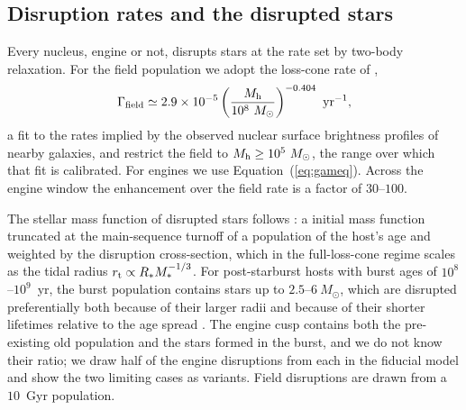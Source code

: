 \documentclass[twocolumn,pdftex]{aastex701}
\newcommand{\msun}{M_{\odot}\xspace}
\begin{document}
\subsection{Disruption rates and the disrupted stars}\label{subsec:rates}

Every nucleus, engine or not, disrupts stars at the rate set by two-body relaxation. For the field population we adopt the loss-cone rate of \citet{Stone:2016a},
\begin{equation}
\Gamma_{\rm field} \simeq 2.9 \times 10^{-5} \left(\frac{M_{\rm h}}{10^{8}~\msun}\right)^{-0.404}~{\rm yr}^{-1},
\label{eq:gfield}
\end{equation}
a fit to the rates implied by the observed nuclear surface brightness profiles of nearby galaxies, and restrict the field to $M_{\rm h} \geq 10^{5}~\msun$, the range over which that fit is calibrated. For engines we use Equation~(\ref{eq:gameq}). Across the engine window the enhancement over the field rate is a factor of $30$--$100$.

The stellar mass function of disrupted stars follows \citet{Kochanek:2016a}: a \citet{Kroupa:2001a} initial mass function truncated at the main-sequence turnoff of a population of the host's age and weighted by the disruption cross-section, which in the full-loss-cone regime scales as the tidal radius $r_{\rm t} \propto R_{\ast} M_{\ast}^{-1/3}$. For post-starburst hosts with burst ages of $10^{8}$--$10^{9}$~yr, the burst population contains stars up to $2.5$--$6~\msun$, which are disrupted preferentially both because of their larger radii and because of their shorter lifetimes relative to the age spread \citep[the regime treated by][]{Mockler:2022a}. The engine cusp contains both the pre-existing old population and the stars formed in the burst, and we do not know their ratio; we draw half of the engine disruptions from each in the fiducial model and show the two limiting cases as variants. Field disruptions are drawn from a $10$~Gyr population.
\end{document}

